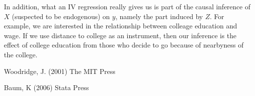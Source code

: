 In addition, what an IV regression really gives us is part of the causal
inference of $X$ (suspected to be endogenous) on $y$, namely the part
induced by $Z$.  For example, we are interested in the relationship
between colleage education and wage.  If we use distance to college as
an instrument, then our inference is the effect of college education
from those who decide to go because of nearbyness of the college.



\begin{thebibliography}{99}

Woodridge, J.
 \newblock (2001)
 \newblock The MIT Press


Baum, K
 \newblock (2006)
 \newblock Stata Press


\end{thebibliography}

